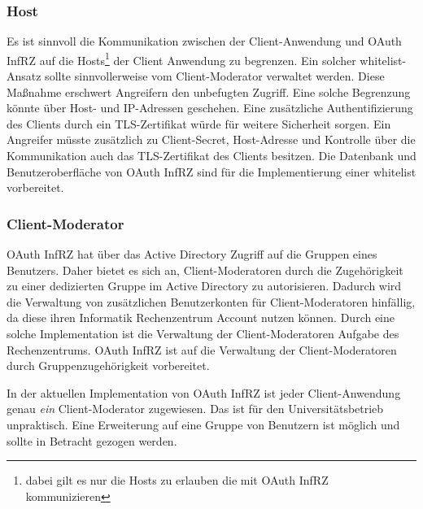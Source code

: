 \documentclass[12pt,a4paper,pointednumbers,abstracton]{scrartcl}
\begin{document}
\subsubsection{Host}
\label{sec:oauth-infrz/host}

Es ist sinnvoll die Kommunikation zwischen der Client-Anwendung und OAuth InfRZ auf die Hosts\footnote{dabei gilt es nur die Hosts zu erlauben die mit OAuth InfRZ kommunizieren} der Client Anwendung zu begrenzen.
Ein solcher whitelist-Ansatz sollte sinnvollerweise vom Client-Moderator verwaltet werden.
Diese Maßnahme erschwert Angreifern den unbefugten Zugriff.
Eine solche Begrenzung könnte über Host- und IP-Adressen geschehen.
Eine zusätzliche Authentifizierung des Clients durch ein TLS-Zertifikat würde für weitere Sicherheit sorgen.
Ein Angreifer müsste zusätzlich zu Client-Secret, Host-Adresse und Kontrolle über die Kommunikation auch das TLS-Zertifikat des Clients besitzen.
Die Datenbank und Benutzeroberfläche von OAuth InfRZ sind für die Implementierung einer whitelist vorbereitet.

\subsubsection{Client-Moderator}
\label{sec:oauth-infrz/moderator}

OAuth InfRZ hat über das Active Directory Zugriff auf die Gruppen eines Benutzers.
Daher bietet es sich an, Client-Moderatoren durch die Zugehörigkeit zu einer dedizierten Gruppe im Active Directory zu autorisieren.
Dadurch wird die Verwaltung von zusätzlichen Benutzerkonten für Client-Moderatoren hinfällig, da diese ihren Informatik Rechenzentrum Account nutzen können.
Durch eine solche Implementation ist die Verwaltung der Client-Moderatoren Aufgabe des Rechenzentrums.
OAuth InfRZ ist auf die Verwaltung der Client-Moderatoren durch Gruppenzugehörigkeit vorbereitet.

In der aktuellen Implementation von OAuth InfRZ ist jeder Client-Anwendung genau \emph{ein} Client-Moderator zugewiesen.
Das ist für den Universitätsbetrieb unpraktisch.
Eine Erweiterung auf eine Gruppe von Benutzern ist möglich und sollte in Betracht gezogen werden.
\end{document}
